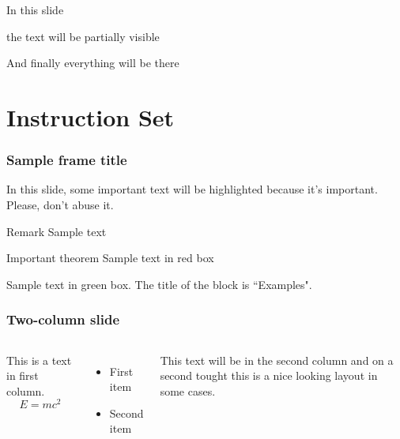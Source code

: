 \documentclass{beamer}
\begin{document}
\begin{frame}
In this slide \pause

the text will be partially visible \pause

And finally everything will be there
\end{frame}

\section{Instruction Set}

\begin{frame}
\frametitle{Sample frame title}

In this slide, some important text will be
\alert{highlighted} because it's important.
Please, don't abuse it.

\begin{block}{Remark}
Sample text
\end{block}

\begin{alertblock}{Important theorem}
Sample text in red box
\end{alertblock}

\begin{examples}
Sample text in green box. The title of the block is ``Examples".
\end{examples}
\end{frame}


\begin{frame}
\frametitle{Two-column slide}

\begin{columns}

This is a text in first column.
$$E=mc^2$$
\begin{itemize}
\item First item
\item Second item
\end{itemize}

This text will be in the second column
and on a second tought this is a nice looking
layout in some cases.
\end{columns}
\end{frame}
\end{document}
